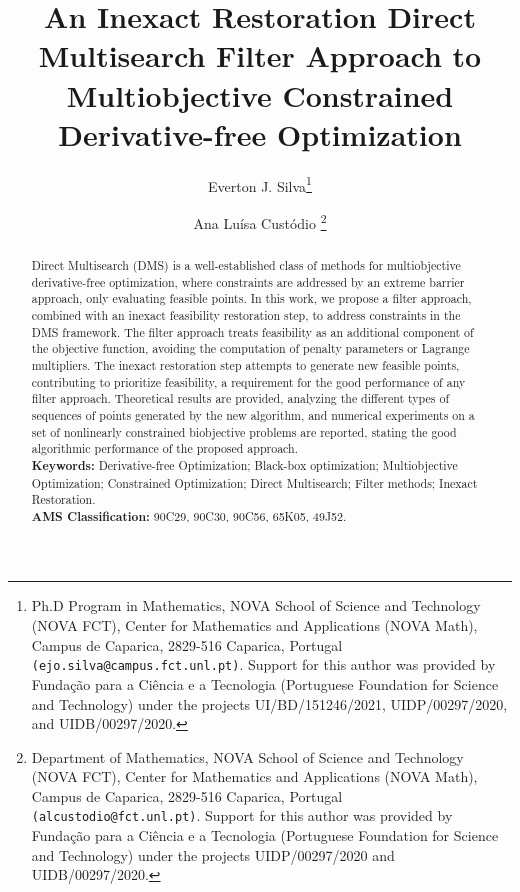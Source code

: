 \documentclass[12pt]{article}
\begin{document}
\title{\textbf{An Inexact Restoration Direct Multisearch Filter Approach to Multiobjective Constrained Derivative-free Optimization}}
\author{Everton J. Silva\thanks{Ph.D Program in Mathematics, NOVA School of Science and Technology (NOVA FCT), Center for Mathematics and Applications (NOVA Math), Campus de Caparica, 2829-516 Caparica, Portugal
\texttt{(ejo.silva@campus.fct.unl.pt)}. Support for this author was provided by Fundação para a Ciência e a Tecnologia (Portuguese Foundation for Science and Technology) under the projects UI/BD/151246/2021, UIDP/00297/2020, and UIDB/00297/2020.} \and Ana Luísa Custódio \thanks{Department of Mathematics, NOVA School of Science and Technology (NOVA FCT), Center for Mathematics and Applications (NOVA Math), Campus de Caparica, 2829-516 Caparica, Portugal \texttt{(alcustodio@fct.unl.pt)}. Support for this author
was provided by Fundação para a Ciência e a Tecnologia (Portuguese Foundation for Science and Technology) under the projects UIDP/00297/2020 and UIDB/00297/2020.}}

\maketitle
\begin{abstract}
Direct Multisearch (DMS) is a well-established class of methods
for multiobjective derivative-free optimization, where constraints
are addressed by an extreme barrier approach, only evaluating
feasible points. In this work, we propose a filter approach,
combined with an inexact feasibility restoration step, to address
constraints in the DMS framework. The filter approach treats
feasibility as an additional component of the objective function,
avoiding the computation of penalty parameters or Lagrange
multipliers. The inexact restoration step attempts to generate new
feasible points, contributing to prioritize feasibility, a
requirement for the good performance of any filter approach.
%
Theoretical results are provided, analyzing the different types of
sequences of points generated by the new algorithm, and numerical
experiments on a set of nonlinearly constrained biobjective
problems are reported, stating the good algorithmic performance of
the proposed approach.
%
\\[5pt]
%
{\bf Keywords:} Derivative-free Optimization; Black-box
optimization; Multiobjective Optimization; Constrained
Optimization; Direct Multisearch; Filter methods; Inexact
Restoration.\\[5pt]
%
{\bf AMS Classification:} 90C29, 90C30, 90C56, 65K05, 49J52.
\end{abstract}
\end{document}
